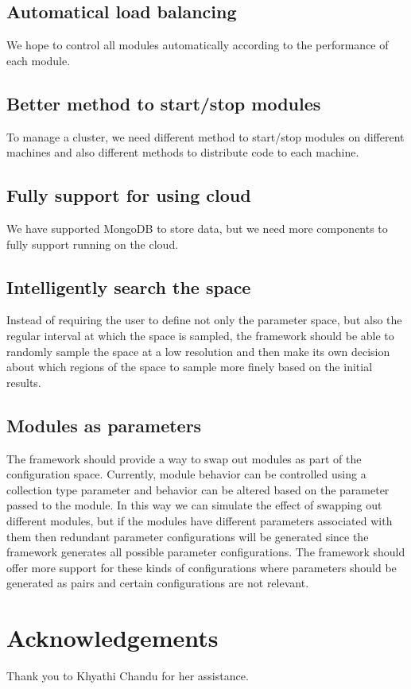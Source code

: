 \documentclass{article}
\begin{document}
    \subsection{Automatical load balancing}
    We hope to control all modules automatically according to the performance of each module.

    \subsection{Better method to start/stop modules}
    To manage a cluster, we need different method to start/stop modules on different machines and also different methods to distribute code to each machine.

    \subsection{Fully support for using cloud}
    We have supported MongoDB to store data, but we need more components to fully support running on the cloud.

    \subsection{Intelligently search the space}
    Instead of requiring the user to define not only the parameter space, but also the regular interval at which the space is sampled, the framework should be able
    to randomly sample the space at a low resolution and then make its own decision about which regions of the space to sample more finely based on the initial results.

    \subsection{Modules as parameters}
    The framework should provide a way to swap out modules as part of the configuration space. Currently, module behavior can be controlled using a collection type parameter
    and behavior can be altered based on the parameter passed to the module. In this way we can simulate the effect of swapping out different modules, but if the modules
    have different parameters associated with them then redundant parameter configurations will be generated since the framework generates all possible parameter configurations.
    The framework should offer more support for these kinds of configurations where parameters should be generated as pairs and certain configurations are not relevant.

\section*{Acknowledgements}
Thank you to Khyathi Chandu for her assistance.




\end{document}
